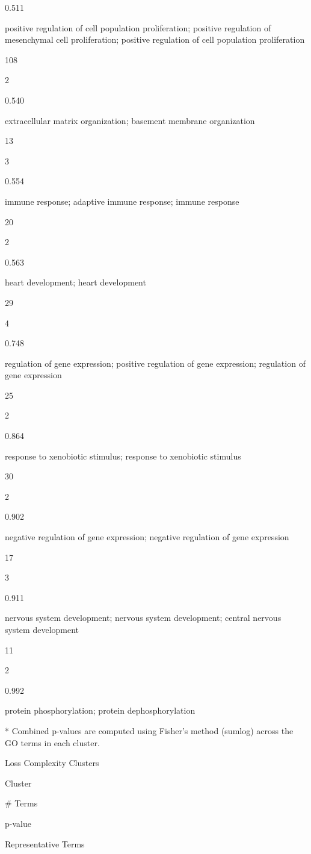 \documentclass[
  letterpaper,
  DIV=11,
  numbers=noendperiod,
  openany,
  oneside]{scrreprt}
\begin{document}
0.511

positive regulation of cell population proliferation; positive
regulation of mesenchymal cell proliferation; positive regulation of
cell population proliferation

108

2

0.540

extracellular matrix organization; basement membrane organization

13

3

0.554

immune response; adaptive immune response; immune response

20

2

0.563

heart development; heart development

29

4

0.748

regulation of gene expression; positive regulation of gene expression;
regulation of gene expression

25

2

0.864

response to xenobiotic stimulus; response to xenobiotic stimulus

30

2

0.902

negative regulation of gene expression; negative regulation of gene
expression

17

3

0.911

nervous system development; nervous system development; central nervous
system development

11

2

0.992

protein phosphorylation; protein dephosphorylation

* Combined p-values are computed using Fisher's method (sumlog) across
the GO terms in each cluster.

Loss Complexity Clusters

Cluster

\# Terms

p-value

Representative Terms
\end{document}

